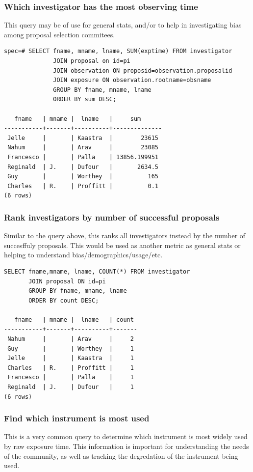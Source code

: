 \documentclass[a4paper,11pt]{article}
\begin{document}
\subsubsection{Which investigator has the most observing time}
This query may be of use for general stats, and/or to help in investigating bias among proposal selection commitees.  

\begin{verbatim}
spec=# SELECT fname, mname, lname, SUM(exptime) FROM investigator 
              JOIN proposal on id=pi 
              JOIN observation ON proposid=observation.proposalid 
              JOIN exposure ON observation.rootname=obsname 
              GROUP BY fname, mname, lname 
              ORDER BY sum DESC;

   fname   | mname |  lname   |     sum      
-----------+-------+----------+--------------
 Jelle     |       | Kaastra  |        23615
 Nahum     |       | Arav     |        23085
 Francesco |       | Palla    | 13856.199951
 Reginald  | J.    | Dufour   |       2634.5
 Guy       |       | Worthey  |          165
 Charles   | R.    | Proffitt |          0.1
(6 rows)
\end{verbatim}

\subsubsection{Rank investigators by number of successful proposals}
Similar to the query above, this ranks all investigators instead by the number of succesffuly proposals.  This would be used as another metric as general stats or helping to understand bias/demographics/usage/etc.  

\begin{verbatim}
SELECT fname,mname, lname, COUNT(*) FROM investigator 
       JOIN proposal ON id=pi 
       GROUP BY fname, mname, lname 
       ORDER BY count DESC;

   fname   | mname |  lname   | count 
-----------+-------+----------+-------
 Nahum     |       | Arav     |     2
 Guy       |       | Worthey  |     1
 Jelle     |       | Kaastra  |     1
 Charles   | R.    | Proffitt |     1
 Francesco |       | Palla    |     1
 Reginald  | J.    | Dufour   |     1
(6 rows)

\end{verbatim}

\subsubsection{Find which instrument is most used}
This is a very common query to determine which instrument is most widely used by raw exposure time.  This information is important for understanding the needs of the community, as well as tracking the degredation of the instrument being used.
\end{document}
